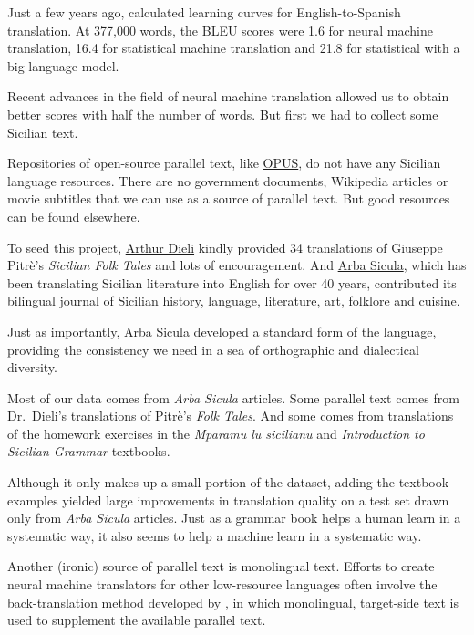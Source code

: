 \documentclass[10pt,letterpaper]{article}
\begin{document}
Just a few years ago, \citet{koehnknowles2017} calculated learning curves for
English-to-Spanish translation.  At 377,000 words, the BLEU scores
were 1.6 for neural machine translation, 16.4 for statistical machine
translation and 21.8 for statistical with a big language model.

Recent advances in the field of neural machine translation allowed us to obtain better scores
with half the number of words.  But first we had to collect some Sicilian text.

Repositories of open-source parallel text, like \href{http://opus.nlpl.eu/}{OPUS},
do not have any Sicilian language resources.  There are no government documents, Wikipedia articles or
movie subtitles that we can use as a source of parallel text. But good resources can be found elsewhere.

To seed this project, \href{http://www.dieli.net/}{Arthur Dieli} kindly provided
34 translations of Giuseppe Pitrè's \textit{Sicilian Folk Tales} and lots of encouragement.
And \href{http://www.arbasicula.org/}{Arba Sicula}, 
which has been translating Sicilian literature into English for over 40 years,
contributed its bilingual journal of Sicilian history, language, literature,
art, folklore and cuisine.

Just as importantly, Arba Sicula developed a standard form of the language,
providing the consistency we need in a sea of orthographic and dialectical diversity.

Most of our data comes from \textit{Arba Sicula} articles.
Some parallel text comes from Dr.~Dieli's translations of Pitrè's \textit{Folk Tales}.
And some comes from translations of the homework exercises in
the \textit{Mparamu lu sicilianu} \citep{cipolla2013} and 
\textit{Introduction to Sicilian Grammar} \citep{bonner2001} textbooks.

Although it only makes up a small portion of the dataset, adding the textbook examples
yielded large improvements in translation quality on a test set drawn only from
\textit{Arba Sicula} articles.  Just as a grammar book helps a human learn
in a systematic way, it also seems to help a machine learn in a systematic way.

Another (ironic) source of parallel text is monolingual text.
Efforts to create neural machine translators for other low-resource languages often
involve the back-translation method developed by \citet{sennrich2015backtrans},
in which monolingual, target-side text is used to supplement the available parallel text.
\end{document}
